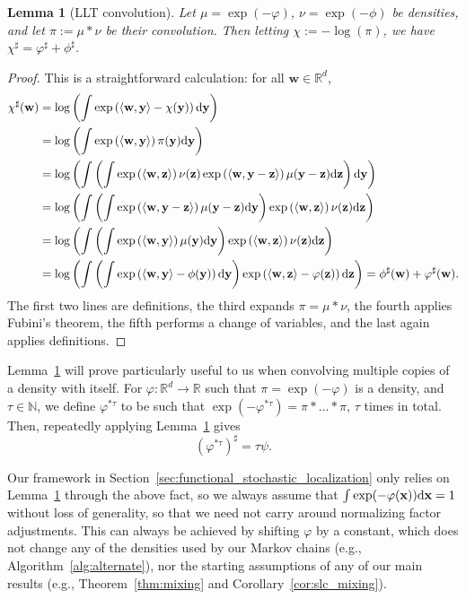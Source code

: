 \documentclass[11pt]{article}
\newtheorem{lemma}{Lemma}
\newcommand{\defeq}{:=}
\newcommand{\inprod}[2]{\left\langle#1, #2\right\rangle}
\newcommand{\R}{\mathbb{R}}
\newcommand{\N}{\mathbb{N}}
\newcommand{\dd}{\textup{d}}
\newcommand{\Par}[1]{\left(#1\right)}
\newcommand{\0}{\mathbf{0}}
\newcommand{\1}{\mathbf{1}}
\newcommand{\vw}{\mathbf{w}}
\newcommand{\vx}{\mathbf{x}}
\newcommand{\vy}{\mathbf{y}}
\newcommand{\vz}{\mathbf{z}}
\newcommand{\vhi}{\varphi}
\begin{document}
\begin{lemma}[LLT convolution]\label{lem:lltconv}
Let $\mu = \exp(-\vhi)$, $\nu = \exp(-\phi)$ be densities, and let $\pi \defeq \mu \ast \nu$ be their convolution. Then letting $\chi \defeq -\log(\pi)$, we have $\chi^\sharp = \vhi^\sharp + \phi^\sharp$.
\end{lemma}
\begin{proof}
This is a straightforward calculation: for all $\vw \in \R^d$,
\begin{align*}
\chi^\sharp(\vw) &= \log\Par{\int\exp\Par{\inprod{\vw}{\vy} - \chi(\vy)} \dd \vy} \\
&= \log\Par{\int\exp\Par{\inprod{\vw}{\vy}} \pi(\vy) \dd \vy} \\
&= \log\Par{\int \Par{\int \exp\Par{\inprod{\vw}{\vz}} \nu(\vz) \exp\Par{\inprod{\vw}{\vy - \vz}} \mu(\vy - \vz) \dd \vz} \dd \vy} \\
&= \log\Par{\int \Par{\int  \exp\Par{\inprod{\vw}{\vy - \vz}} \mu(\vy - \vz) \dd \vy} \exp\Par{\inprod{\vw}{\vz}} \nu(\vz) \dd \vz} \\
&= \log\Par{\int \Par{\int  \exp\Par{\inprod{\vw}{\vy}} \mu(\vy) \dd \vy} \exp\Par{\inprod{\vw}{\vz}} \nu(\vz) \dd \vz} \\
&= \log\Par{\int \Par{\int  \exp\Par{\inprod{\vw}{\vy} - \phi(\vy)} \dd \vy} \exp\Par{\inprod{\vw}{\vz} - \vhi(\vz)} \dd \vz} = \phi^\sharp(\vw) + \vhi^\sharp(\vw).
\end{align*}
The first two lines are definitions, the third expands $\pi = \mu \ast \nu$, the fourth applies Fubini's theorem, the fifth performs a change of variables, and the last again applies definitions.
\end{proof}

Lemma~\ref{lem:lltconv} will prove particularly useful to us when convolving multiple copies of a density with itself. For $\vhi: \R^d \to \R$ such that $\pi = \exp(-\vhi)$ is a density, and $\tau \in \N$, we define $\vhi^{\ast \tau}$ to be such that $\exp(-\vhi^{\ast \tau}) = \pi \ast \ldots \ast \pi$, $\tau$ times in total. Then, repeatedly applying Lemma~\ref{lem:lltconv} gives
\[\Par{\vhi^{\ast \tau}}^\sharp = \tau \psi.\]

Our framework in Section~\ref{sec:functional_stochastic_localization} only relies on Lemma~\ref{lem:lltconv} through the above fact, so we always assume that $\int \exp(-\vhi(\vx)) \dd \vx = 1$ without loss of generality, so that we need not carry around normalizing factor adjustments. This can always be achieved by shifting $\vhi$ by a constant, which does not change any of the densities used by our Markov chains (e.g., Algorithm~\ref{alg:alternate}), nor the starting assumptions of any of our main results (e.g., Theorem~\ref{thm:mixing} and Corollary~\ref{cor:slc_mixing}).
\end{document}
